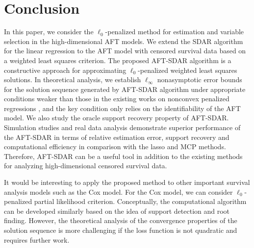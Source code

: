 \documentclass[12pt]{article}
\begin{document}
\section{Conclusion}
\label{sec:15}
In this paper, we consider the $\ell_0$-penalized method for estimation and variable selection in the high-dimensional AFT models.
We extend the SDAR algorithm for the linear regression
to the AFT model with censored survival data based on a weighted least squares criterion.
The proposed AFT-SDAR algorithm is a constructive approach for approximating
$\ell_0$-penalized weighted least squares solutions. In theoretical analysis, we establish
$\ell_\infty$  nonasymptotic error bounds for the solution sequence generated by AFT-SDAR algorithm  {under appropriate conditions weaker than  those in the existing works on nonconvex penalized regressions
\citep{Zhangzhang,huang2018constructive,mw2019},
and the key condition only relies on the identifiability of the AFT model}.
We also study the oracle support recovery property of AFT-SDAR.
Simulation studies and real data analysis demonstrate superior performance of the AFT-SDAR in terms of relative estimation error, support recovery and computational efficiency in comparison with
the lasso and MCP methods.
Therefore, AFT-SDAR can be a useful tool in addition to the existing methods for analyzing high-dimensional censored survival data.

It would be interesting to apply the proposed method to other
important survival analysis models such as the Cox model.
For the Cox model, we can consider $\ell_0$-penalized partial likelihood criterion.
Conceptually, the computational algorithm can be developed similarly based on the idea of support detection and root finding. However, the
theoretical analysis of the convergence properties of the solution
sequence is more challenging if the loss function is not quadratic and requires further work.


\end{document}
